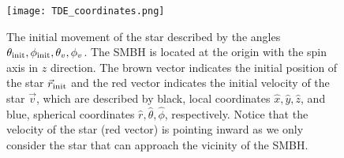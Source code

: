 \documentclass[useAMS,usenatbib]{mn2e}
\def\thetainit{\theta_{\rm init}}
\def\phiinit{\phi_{\rm init}}
\def\note{\textcolor{magenta}}
\begin{document}

\begin{figure}
    \centering
    \texttt{[image: TDE\_coordinates.png]}
    \caption{
    The initial movement of the star described by the angles $\thetainit,\phiinit,\theta_v,\phi_v$. 
    The SMBH is located at the origin with the spin axis in $z$ direction.
    The brown vector indicates the initial position of the star $\vec{r}_{\rm init}$ and the red vector indicates the initial velocity of the star $\vec{v}$, which are described by black, local coordinates $\hat{x},\hat{y},\hat{z}$, and blue, spherical coordinates $\hat{r},\hat{\theta},\hat{\phi}$, respectively.
    Notice that the velocity of the star (red vector) is pointing inward as we only consider the star that can approach the vicinity of the SMBH.
    }
    \label{fig:TDE_coordinates}
\end{figure}


\end{document}
